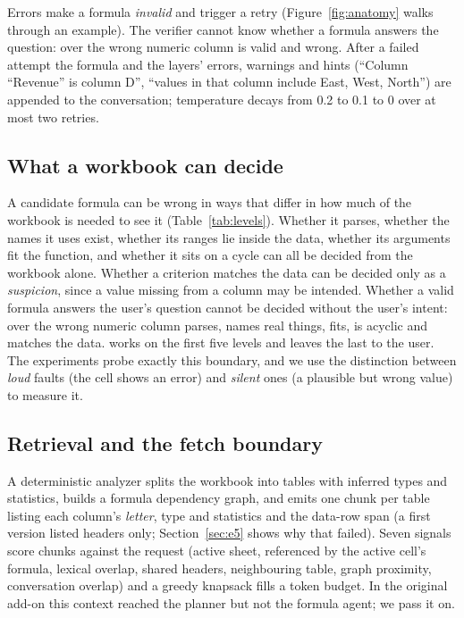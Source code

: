 
Errors make a formula \emph{invalid} and trigger a retry (Figure~\ref{fig:anatomy} walks through an example). The verifier cannot know whether a formula answers the question:  over the wrong numeric column is valid and wrong. After a failed attempt the formula and the layers' errors, warnings and hints (``Column ``Revenue'' is column D'', ``values in that column include East, West, North'') are appended to the conversation; temperature decays from 0.2 to 0.1 to 0 over at most two retries.

\subsection{What a workbook can decide}
\label{sec:levels}
A candidate formula can be wrong in ways that differ in how much of the workbook is needed to see it (Table~\ref{tab:levels}). Whether it parses, whether the names it uses exist, whether its ranges lie inside the data, whether its arguments fit the function, and whether it sits on a cycle can all be decided from the workbook alone. Whether a criterion matches the data can be decided only as a \emph{suspicion}, since a value missing from a column may be intended. Whether a valid formula answers the user's question cannot be decided without the user's intent:  over the wrong numeric column parses, names real things, fits, is acyclic and matches the data. \gc{} works on the first five levels and leaves the last to the user. The experiments probe exactly this boundary, and we use the distinction between \emph{loud} faults (the cell shows an error) and \emph{silent} ones (a plausible but wrong value) to measure it.



\subsection{Retrieval and the fetch boundary}
\label{sec:retrieval}
A deterministic analyzer splits the workbook into tables with inferred types and statistics, builds a formula dependency graph, and emits one chunk per table listing each column's \emph{letter}, type and statistics and the data-row span (a first version listed headers only; Section~\ref{sec:e5} shows why that failed). Seven signals score chunks against the request (active sheet, referenced by the active cell's formula, lexical overlap, shared headers, neighbouring table, graph proximity, conversation overlap) and a greedy knapsack fills a token budget. In the original add-on this context reached the planner but not the formula agent; we pass it on.

